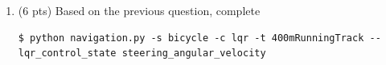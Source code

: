 \documentclass[11pt]{article}
\begin{document}
\begin{enumerate}
\begin{equation*}
\begin{split}
                                   & = \begin{bmatrix} 
                                    \textcolor{blue}{1} & \textcolor{blue}{-v \cdot \Delta t} & \textcolor{blue}{0} \\ 
                                    \textcolor{blue}{0} & \textcolor{blue}{1} & \textcolor{blue}{-\frac{v}{L} \Delta t} \\ 
                                    \textcolor{blue}{0} & \textcolor{blue}{0} & \textcolor{blue}{1} \end{bmatrix}
                  \begin{bmatrix} e_k \\ \theta_{e,k} \\ \delta_k \end{bmatrix} +
                  \begin{bmatrix} 
                    \textcolor{blue}{0} \\ 
                    \textcolor{blue}{0} \\ 
                    \textcolor{blue}{\Delta t} \end{bmatrix}
                  \begin{bmatrix} \dot{\delta}_k \end{bmatrix}
              \end{split}
          \end{equation*}
    \item \textbf{\faPython} (6 pts) Based on the previous question, complete \textcolor{teal}{\texttt{\allowbreak{}}}
          \begin{lstlisting}
$ python navigation.py -s bicycle -c lqr -t 400mRunningTrack --lqr_control_state steering_angular_velocity
          \end{lstlisting}
\end{enumerate}
\end{document}
